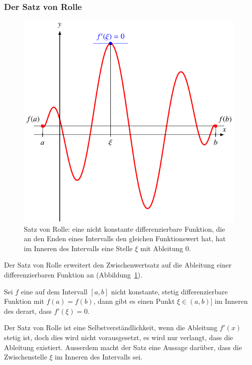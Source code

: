 \subsubsection{Der Satz von Rolle}
\begin{figure}
\centering
\includegraphics{chapters/30-interpolation/figures/rolle.pdf}
\caption{Satz von Rolle: eine nicht konstante differenzierbare Funktion,
die an den Enden eines Intervalls den gleichen Funktionswert hat, hat im 
Inneren des Intervalls eine Stelle $\xi$ mit Ableitung $0$.
\label{buch:figure:rolle}}
\end{figure}
Der Satz von Rolle erweitert den Zwischenwertsatz auf die Ableitung einer
differenzierbaren Funktion an (Abbildung~\ref{buch:figure:rolle}).

\begin{satz}[Rolle]
\label{buch:satz:rolle}
%
%
Sei $f$ eine auf dem Intervall $[a,b]$ nicht konstante,
stetig differenzierbare Funktion
mit $f(a)=f(b)$, dann gibt es einen Punkt $\xi\in(a,b)]$ im Inneren
des derart, dass $f'(\xi)=0$.
\end{satz}

Der Satz von Rolle ist eine Selbstverständlichkeit, wenn die Ableitung
$f'(x)$ stetig ist, doch dies wird nicht vorausgesetzt, es wird nur
verlangt, dass die Ableitung existiert.
Ausserdem macht der Satz eine Aussage darüber, dass die Zwischenstelle
$\xi$ im Inneren des Intervalls sei.

